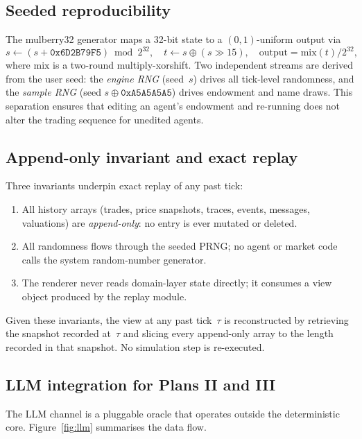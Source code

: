 \subsection{Seeded reproducibility}

The mulberry32 generator maps a 32-bit state to a $(0,1)$-uniform
output via
\begin{equation}
s \gets (s + \texttt{0x6D2B79F5}) \bmod 2^{32},\quad
t \gets s \oplus (s \gg 15),\quad
\text{output} = \text{mix}(t) / 2^{32},
\label{eq:prng}
\end{equation}
where $\text{mix}$ is a two-round multiply-xorshift.  Two independent
streams are derived from the user seed: the \emph{engine RNG}
(seed~$s$) drives all tick-level randomness, and the \emph{sample
RNG} (seed $s \oplus \texttt{0xA5A5A5A5}$) drives endowment and name
draws.  This separation ensures that editing an agent's endowment and
re-running does not alter the trading sequence for unedited agents.

\subsection{Append-only invariant and exact replay}

Three invariants underpin exact replay of any past tick:
\begin{enumerate}[nosep]
\item All history arrays (trades, price snapshots, traces, events,
  messages, valuations) are \emph{append-only}: no entry is ever
  mutated or deleted.
\item All randomness flows through the seeded PRNG; no agent or
  market code calls the system random-number generator.
\item The renderer never reads domain-layer state directly; it
  consumes a view object produced by the replay module.
\end{enumerate}
Given these invariants, the view at any past tick~$\tau$ is
reconstructed by retrieving the snapshot recorded at~$\tau$ and
slicing every append-only array to the length recorded in that
snapshot.  No simulation step is re-executed.

\subsection{LLM integration for Plans II and III}

The LLM channel is a pluggable oracle that operates outside the
deterministic core.  Figure~\ref{fig:llm} summarises the data flow.

